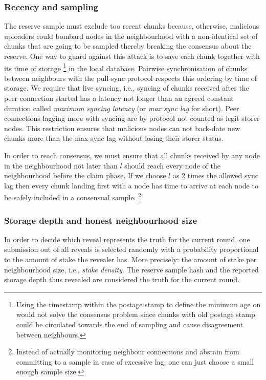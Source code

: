 \subsubsection{Recency and sampling}

The reserve sample must exclude too recent chunks because, otherwise, malicious uploaders could bombard nodes in the neighbourhood with a non-identical set of chunks  that are going to be sampled thereby breaking the consensus about the reserve. One way to guard against this attack is to save each chunk together with its time of storage%
%
\footnote{Using the timestamp within the postage stamp to define the minimum age on would not solve the consensus problem since chunks with old postage stamp could be circulated towards the end of sampling and cause disagreement between neighbours.}
% 
in the local database.
Pairwise synchronisation of chunks between neighbours with the pull-sync protocol respects this ordering by time of storage. 
We require that live syncing, i.e., syncing of chunks received after the peer connection started has a latency not longer than an agreed constant duration called \emph{maximum syncing latency} (or \emph{max sync lag} for short). Peer connections lagging more with syncing are by protocol not counted as legit storer nodes. This restriction ensures that malicious nodes can not back-date new chunks more than the max sync lag without losing their storer status. 

In order to reach consensus, we must ensure that all chunks received by any node in the neighbourhood not later than $l$ should reach every node of the neighbourhood before the claim phase.
%
If we choose $l$ as 2 times the allowed sync lag then every chunk landing first with a node has time to arrive at each node to be safely included in a consensual sample.%
%
\footnote{Instead of actually monitoring neighbour connections and abstain from committing to a sample in case of excessive lag, one can just choose a small enough sample size.}%
%

\subsubsection{Storage depth and honest neighbourhood size}

In order to decide which reveal represents the truth for the current round, one submission out of all reveals is selected randomly with a probability proportional to the amount of stake the revealer has. More precisely: the amount of stake per neighbourhood size, i.e.,    \emph{stake density}. The reserve sample hash and the reported storage depth thus revealed are considered the truth for the current round. 

